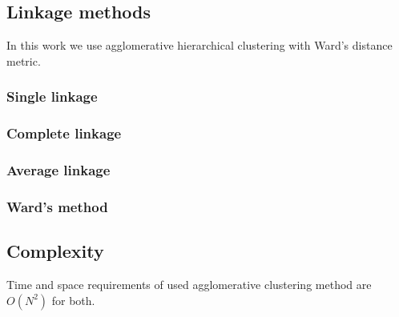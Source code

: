 \subsection{Linkage methods}
In this work we use agglomerative hierarchical clustering with 
Ward's distance metric.

\subsubsection{Single linkage}
\subsubsection{Complete linkage}
\subsubsection{Average linkage}
\subsubsection{Ward's method}

\subsection{Complexity}
Time and space requirements of used agglomerative clustering method
are $O(N^2)$ for both.


